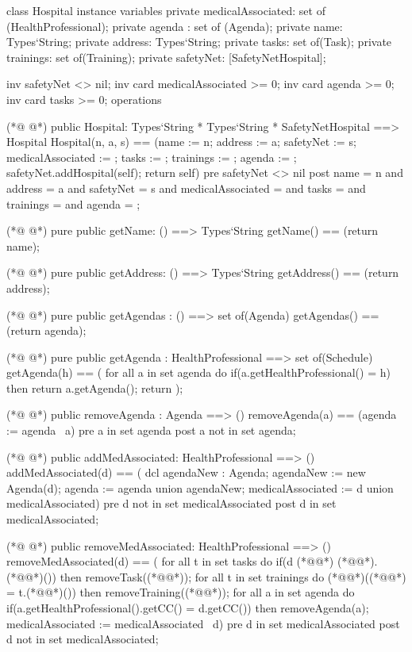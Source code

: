 \begin{vdmpp}[breaklines=true]
class Hospital
instance variables
  private medicalAssociated: set of (HealthProfessional);
  private agenda : set of (Agenda);
  private name: Types`String;
  private address: Types`String;
  private tasks: set of(Task);
  private trainings: set of(Training);
  private safetyNet: [SafetyNetHospital];
 
 inv safetyNet <> nil; 
 inv card medicalAssociated >= 0;
 inv card agenda >= 0;
 inv card tasks >= 0;
operations

(*@
\label{Hospital:17}
@*)
 public Hospital: Types`String * Types`String * SafetyNetHospital ==> Hospital
  Hospital(n, a, s) == (name := n; address := a; safetyNet := s; medicalAssociated := {}; tasks := {}; trainings := {}; agenda := {};
  safetyNet.addHospital(self); return self)
 pre safetyNet <> nil
 post name = n and address = a and safetyNet = s and medicalAssociated = {} and tasks = {} and trainings = {} and agenda = {};
 
(*@
\label{getName:23}
@*)
 pure public getName: () ==> Types`String
  getName() == (return name);
 
(*@
\label{getAddress:26}
@*)
 pure public getAddress: () ==> Types`String
  getAddress() == (return address);
 
(*@
\label{getAgendas:29}
@*)
 pure public getAgendas : () ==> set of(Agenda)
  getAgendas() == (return agenda);
  
(*@
\label{getAgenda:32}
@*)
 pure public getAgenda : HealthProfessional ==> set of(Schedule)
  getAgenda(h) == (
   for all a in set agenda do
    if(a.getHealthProfessional() = h)
     then return a.getAgenda();
   return {});
 
(*@
\label{removeAgenda:39}
@*)
 public removeAgenda : Agenda ==> ()
  removeAgenda(a) == (agenda := agenda \ {a})
 pre a in set agenda
 post a not in set agenda;
 
(*@
\label{addMedAssociated:44}
@*)
 public addMedAssociated: HealthProfessional ==> ()
  addMedAssociated(d) == (
   dcl agendaNew : Agenda;
   agendaNew := new Agenda(d);
   agenda := agenda union {agendaNew};
   medicalAssociated := {d} union medicalAssociated)
 pre d not in set medicalAssociated
 post d in set medicalAssociated;
  
(*@
\label{removeMedAssociated:53}
@*)
 public removeMedAssociated: HealthProfessional ==> ()
  removeMedAssociated(d) == (
   for all t in set tasks do
    if(d (*@\vdmnotcovered{=}@*) (*@@*).(*@@*)())
     then removeTask((*@@*));
   for all t in set trainings do
    (*@@*)((*@@*) = t.(*@@*)())
     then removeTraining((*@@*));
   for all a in set agenda do
    if(a.getHealthProfessional().getCC() = d.getCC())
     then removeAgenda(a);
   medicalAssociated := medicalAssociated \ {d})
 pre d in set medicalAssociated
 post d not in set medicalAssociated;
 

\end{vdmpp}
